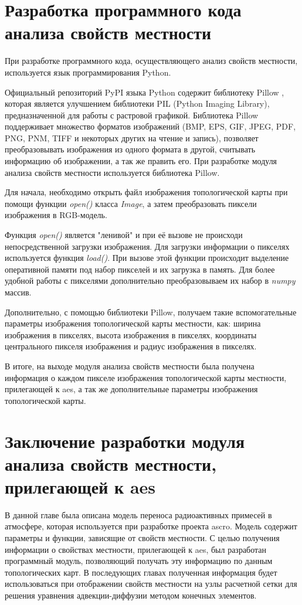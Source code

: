 \section{Разработка программного кода анализа свойств местности}

При разработке программного кода, осуществляющего анализ свойств местности, используется язык программирования Python. 

Официальный репозиторий PyPI языка Python содержит библиотеку Pillow \cite{pillow}, которая является улучшением 
библиотеки PIL (Python Imaging Library), предназначенной для работы с растровой графикой. Библиотека Pillow 
поддерживает множество форматов изображений (BMP, EPS, GIF, JPEG, PDF, PNG, PNM, TIFF и некоторых других на чтение и 
запись), позволяет преобразовывать изображения из одного формата в другой, считывать информацию об изображении, а так 
же править его. При разработке модуля анализа свойств местности используется библиотека Pillow.

Для начала, необходимо открыть файл изображения топологической карты при помощи функции \textit{open()} класса 
\textit{Image}, а затем преобразовать пиксели изображения в RGB-модель.

Функция \textit{open()} является "ленивой" и при её вызове не происходи непосредственной загрузки изображения. Для 
загрузки информации о пикселях используется функция \textit{load()}. При вызове этой функции происходит выделение 
оперативной памяти под набор пикселей и их загрузка в память. Для более удобной работы с пикселями дополнительно 
преобразовываем их набор в \textit{numpy} массив.

Дополнительно, с помощью библиотеки Pillow, получаем такие вспомогательные параметры изображения топологической карты 
местности, как: ширина изображения в пикселях, высота изображения в пикселях, координаты центрального пикселя изображения 
и радиус изображения в пикселях.

В итоге, на выходе модуля анализа свойств местности была получена информация о каждом пикселе изображения топологической 
карты местности, прилегающей к \ac{aes}, а так же дополнительные параметры изображения топологической карты.

\section{Заключение разработки модуля анализа свойств местности, прилегающей к \ac{aes}}

В данной главе была описана модель переноса радиоактивных примесей в атмосфере, которая используется при разработке 
проекта \ac{ascro}. Модель содержит параметры и функции, зависящие от свойств местности. С целью получения информации о 
свойствах местности, прилегающей к \ac{aes}, был разработан программный модуль, позволяющий получать эту информацию по 
данным топологических карт. В последующих главах полученная информация будет использоваться при отображении свойств 
местности на узлы расчетной сетки для решения уравнения адвекции-диффузии методом конечных элементов.